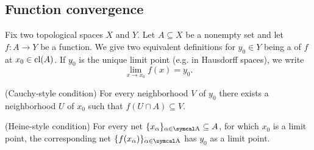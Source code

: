 \subsection{Function convergence}\label{subsec:function_convergence}

\begin{definition}\label{def:local_convergence}
  Fix two topological spaces \( X \) and \( Y \). Let \( A \subseteq X \) be a nonempty set and let \( f: A \to Y \) be a function. We give two equivalent definitions for \( y_0 \in Y \) being a  of \( f \) at \( x_0 \in \operatorname{cl}(A) \). If \( y_0 \) is the unique limit point (e.g. in Hausdorff spaces), we write
  \begin{equation*}
    \lim_{x \to x_0} f(x) = y_0.
  \end{equation*}

  \begin{defenum}
    (Cauchy-style condition) For every neighborhood \( V \) of \( y_0 \) there exists a neighborhood \( U \) of \( x_0 \) such that \( f(U \cap A) \subseteq V \).

    (Heine-style condition) For every net \( \{ x_\al \}_{\al \in \CA} \subseteq A \), for which \( x_0 \) is a limit point, the corresponding net \( \{ f(x_\al) \}_{\al \in \CA} \) has \( y_0 \) as a limit point.
  \end{defenum}
\end{definition}
